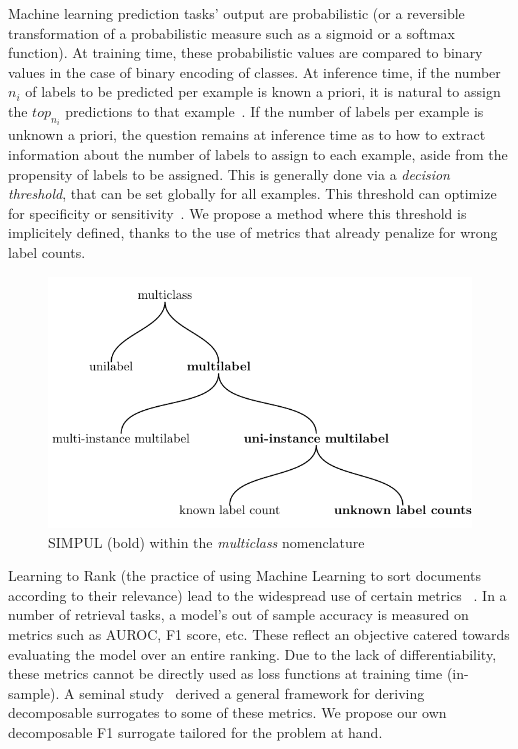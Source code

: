 Machine learning prediction tasks' output are probabilistic (or a reversible transformation of a probabilistic measure such as a sigmoid or a softmax function). At training time, these probabilistic values are compared to binary values in the case of binary encoding of classes. At inference time, if the number $n_i$ of labels to be predicted per example is known a priori, it is natural to assign the $top_{n_i}$ predictions to that example~\cite{lossTopKError, topKmulticlassSVM}. If the number of labels per example is unknown a priori, the question remains at inference time as to how to extract information about the number of labels to assign to each example, aside from the propensity of labels to be assigned. This is generally done via a \emph{decision threshold}, that can be set globally for all examples. This threshold can optimize for specificity or sensitivity~\cite{decisionThreshold}. We propose a method where this threshold is implicitely defined, thanks to the use of metrics that already penalize for wrong label counts.

\begin{figure}[t]
\centering
\includegraphics[width=.9\linewidth]{./tree/Tree.pdf}
\caption{\label{fig:tree}
SIMPUL (bold) within the \emph{multiclass} nomenclature
}
\end{figure}

Learning to Rank (the practice of using Machine Learning to sort documents according to their relevance) lead to the widespread use of certain metrics~\cite{LTR} . In a number of retrieval tasks, a model's out of sample accuracy is measured on metrics such as AUROC, F1 score, etc. These reflect an objective catered towards evaluating the model over an entire ranking. Due to the lack of differentiability, these metrics cannot be directly used as loss functions at training time (in-sample). A seminal study~\cite{optimizableLosses} derived a general framework for deriving decomposable surrogates to some of these metrics. We propose our own decomposable F1 surrogate tailored for the problem at hand.

